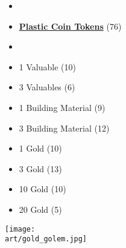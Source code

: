 \begin{multicols*}{2}
\begin{itemize}[leftmargin=0pt, label={}, noitemsep]
  \item
  \item \textbf{\small{\underline{Plastic Coin Tokens}}} (76)
  \item
  \item 1 Valuable (10)
  \item 3 Valuables (6)
  \item 1 Building Material (9)
  \item 3 Building Material (12)
  \item 1 Gold (10)
  \item 3 Gold (13)
  \item 10 Gold (10)
  \item 20 Gold (5)
\end{itemize}

\columnbreak

\hspace{-2.75em}
\texttt{[image: \\art/gold\_golem.jpg]}

\end{multicols*}
